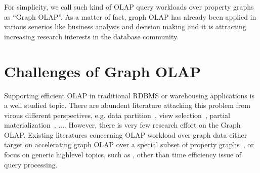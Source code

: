 For simplicity, we call such kind of OLAP query workloads over property graphs as ``Graph OLAP''. As a matter of fact, graph OLAP has already been applied in various senerios like business analysis and decision making and it is attracting increasing research interests in the database community.



\section{Challenges of Graph OLAP}


Supporting efficient OLAP in traditional RDBMS or warehousing applications is a well studied topic. There are abundent literature attacking this problem from virous different perspectives, e.g. data partition~\cite{DBLP:conf/ismis/CuzzocreaL12,}, view selection~\cite{DBLP:books/igi/Taniar10/LawrenceR10,}, partial materialization~\cite{DBLP:journals/kais/DrzadzewskiT16,}, .... However, there is very few research effort on the Graph OLAP. Existing literatures concerning OLAP workload over graph data either target on accelerating graph OLAP over a special subset of property graphs~\cite{DBLP:conf/sigmod/ZhaoLXH11}, or focus on generic highlevel topics, such as \cite{DBLP:conf/esws/MaaliCD15} \cite{DBLP:conf/icdm/ChenYZHY08},  other than time efficiency issue of query processing.


